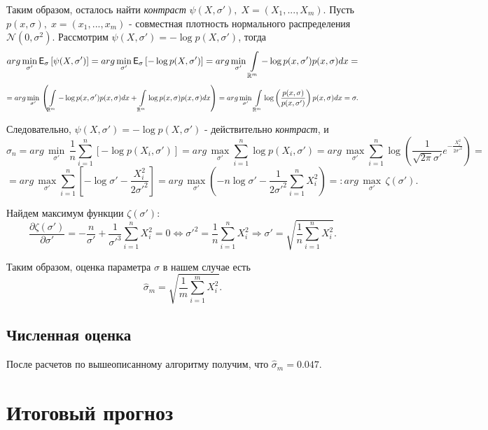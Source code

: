 Таким образом, осталось найти \textit{контраст} $\psi(X, \sigma'), \; X = (X_1, ..., X_m)$. Пусть $p(x, \sigma), \; x = (x_1, ..., x_m)$ - совместная плотность нормального распределения $\mathcal N(0, \sigma^2)$. Рассмотрим $\psi(X, \sigma') = -\log p(X, \sigma')$, тогда
\[
arg \, \underset{\sigma'}{\min} \, \textsf E_{\sigma} \left[ \psi(X, \sigma') \right] = arg \, \underset{\sigma'}{\min} \, \textsf E_{\sigma} \left[ -\log p(X, \sigma') \right] = arg \, \underset{\sigma'}{\min} \, \int\limits_{\mathbb R^m} -\log p(x, \sigma') p(x, \sigma) dx =
\]
\[
= arg \, \underset{\sigma'}{\min} \, \left( \int\limits_{\mathbb R^m} -\log p(x, \sigma') p(x, \sigma) dx + \int\limits_{\mathbb R^m} \log p(x, \sigma) p(x, \sigma) dx  \right) =  arg \, \underset{\sigma'}{\min} \, \int\limits_{\mathbb R^m} \log \left( \frac{p(x, \sigma)}{p(x, \sigma')} \right) p(x, \sigma) dx = \sigma.
\]

Следовательно, $\psi(X, \sigma') = -\log p(X, \sigma')$ - действительно \textit{контраст}, и
\[
\hat{\sigma}_n = arg \, \underset{\sigma'}{\min} \, \frac 1n \sum\limits_{i=1}^n \left[ -\log p(X_i, \sigma') \right] = arg \, \underset{\sigma'}{\max} \sum\limits_{i=1}^n \log p(X_i, \sigma') = arg \, \underset{\sigma'}{\max} \sum\limits_{i=1}^n \log \left( \frac{1}{\sqrt{2 \pi} \sigma'} e^{-\frac{X_i^2}{2 \sigma'^2}} \right) =
\]
\[
= arg \, \underset{\sigma'}{\max} \sum\limits_{i=1}^n \left[ -\log \sigma' - \frac{X_i^2}{2 \sigma'^2} \right] = arg \, \underset{\sigma'}{\max} \left( -n \log \sigma' - \frac{1}{2 \sigma'^2} \sum\limits_{i=1}^n X_i^2 \right) =: arg \, \underset{\sigma'}{\max} \, \zeta(\sigma').
\]

Найдем максимум функции $\zeta(\sigma')$:
\[
\frac{\partial \zeta(\sigma')}{\partial \sigma'} = -\frac{n}{\sigma'} + \frac{1}{\sigma'^3} \sum\limits_{i=1}^n X_i^2 = 0 \Leftrightarrow \sigma'^2 = \frac{1}{n} \sum\limits_{i=1}^n X_i^2 \Rightarrow \sigma' = \sqrt{\frac{1}{n} \sum\limits_{i=1}^n X_i^2}.
\]

Таким образом, оценка параметра $\sigma$ в нашем случае есть
\[
\hat{\sigma}_m = \sqrt{\frac{1}{m} \sum\limits_{i=1}^m X_i^2}.
\]

\subsection{Численная оценка}

После расчетов по вышеописанному алгоритму получим, что $\hat{\sigma}_m = 0.047$.

\section{Итоговый прогноз}



